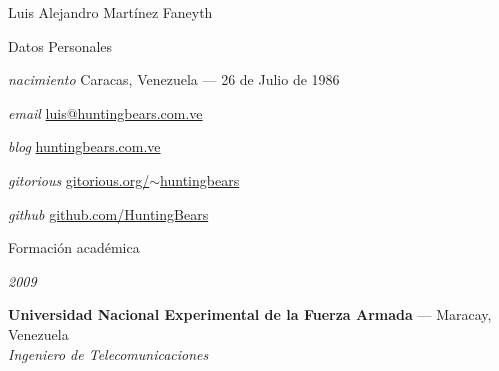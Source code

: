 \documentclass[letterpaper]{scrartcl}
\begin{document}
\begin{cv}{Luis Alejandro Mart\'inez Faneyth}

\vspace{1em}

\begin{cvlist}{Datos Personales}
\item[\textit{\small{nacimiento}}]{Caracas, Venezuela --- 26 de Julio de 1986}
\item[\textit{\small{email}}]{\href{mailto:luis@huntingbears.com.ve}{luis@huntingbears.com.ve}}
\item[\textit{\small{blog}}]{\href{http://huntingbears.com.ve/}{huntingbears.com.ve}}
\item[\textit{\small{gitorious}}]{\href{http://gitorious.org/~huntingbears}{gitorious.org/$\sim$huntingbears}}
\item[\textit{\small{github}}]{\href{http://github.com/HuntingBears}{github.com/HuntingBears}}
\end{cvlist}

\begin{cvlist}{Formaci\'on acad\'emica}
\item[{\parbox[t]{6em}{\textit{\large{2009}}}}]{
	\parbox[t]{\linewidth}{
		\textbf{Universidad Nacional Experimental de la Fuerza Armada} --- Maracay, Venezuela\\
		\textit{Ingeniero de Telecomunicaciones}
	}
}
\end{cvlist}


\end{cv}
\end{document}
